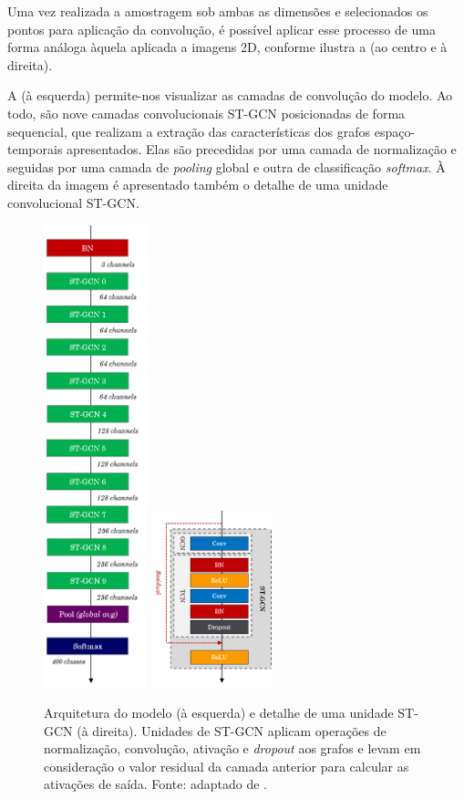 Uma vez realizada a amostragem sob ambas as dimensões e selecionados os pontos para aplicação da convolução, é possível aplicar esse processo de uma forma análoga àquela aplicada a imagens 2D, conforme ilustra a  (ao centro e à direita).



A  (à esquerda) permite-nos visualizar as camadas de convolução do modelo. Ao todo, são nove camadas convolucionais ST-GCN posicionadas de forma sequencial, que realizam a extração das características dos grafos espaço-temporais apresentados. Elas são precedidas por uma camada de normalização e seguidas por uma camada de \textit{pooling} global e outra de classificação \textit{softmax}. À direita da imagem é apresentado também o detalhe de uma unidade convolucional ST-GCN.

\begin{figure}[ht]
    \centering
    \includegraphics[width=3.0cm]{images/st_gcn_architecture}
    \includegraphics[width=3.5cm]{images/st_gcn_architeture_unit}
    \caption{Arquitetura do modelo (à esquerda) e detalhe de uma unidade ST-GCN (à direita). Unidades de ST-GCN aplicam operações de normalização, convolução, ativação e \textit{dropout} aos grafos e levam em consideração o valor residual da camada anterior para calcular as ativações de saída. Fonte: adaptado de \cite{st-gcn-2018}.}
    \label{fig:st-gcn-architecture}
\end{figure}


